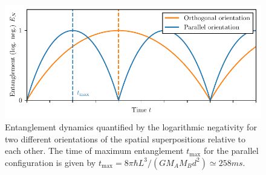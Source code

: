 \begin{figure}[!htbp]
  \centering
  \includegraphics[width=\textwidth]{./../figures/entanglement-time-orientation.pdf}
  \caption{Entanglement dynamics quantified by the logarithmic negativity for two different orientations of the spatial superpositions relative to each other. The time of maximum entanglement $t_\mathrm{max}$ for the parallel configuration is given by $t_\mathrm{max} = 8\pi\hbar L^3 / (G M_A M_B d^2) \simeq 258\si{ms}$.}
\end{figure}